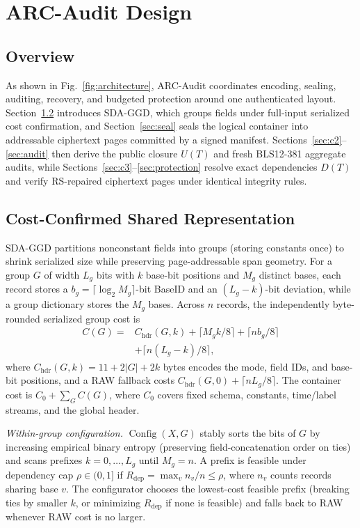 \documentclass[10pt,journal]{IEEEtran}
\begin{document}
\section{ARC-Audit Design}\label{sec:design}
\subsection{Overview}
As shown in Fig.~\ref{fig:architecture}, ARC-Audit coordinates encoding, sealing, auditing, recovery, and budgeted protection around one authenticated layout. Section~\ref{sec:c1} introduces SDA-GGD, which groups fields under full-input serialized cost confirmation, and Section~\ref{sec:seal} seals the logical container into addressable ciphertext pages committed by a signed manifest. Sections~\ref{sec:c2}--\ref{sec:audit} then derive the public closure $U(T)$ and fresh BLS12-381 aggregate audits, while Sections~\ref{sec:c3}--\ref{sec:protection} resolve exact dependencies $D(T)$ and verify RS-repaired ciphertext pages under identical integrity rules.

\subsection{Cost-Confirmed Shared Representation}\label{sec:c1}
SDA-GGD partitions nonconstant fields into groups (storing constants once) to shrink serialized size while preserving page-addressable span geometry. For a group $G$ of width $L_g$ bits with $k$ base-bit positions and $M_g$ distinct bases, each record stores a $b_g=\lceil\log_2 M_g\rceil$-bit BaseID and an $(L_g-k)$-bit deviation, while a group dictionary stores the $M_g$ bases. Across $n$ records, the independently byte-rounded serialized group cost is
\begin{equation}\label{eq:cost}
\begin{split}
C(G)={}&C_{\mathrm{hdr}}(G,k)+\lceil M_gk/8\rceil+\lceil nb_g/8\rceil\\
 &+\lceil n(L_g-k)/8\rceil,
\end{split}
\end{equation}
where $C_{\mathrm{hdr}}(G,k)=11+2|G|+2k$ bytes encodes the mode, field IDs, and base-bit positions, and a RAW fallback costs $C_{\mathrm{hdr}}(G,0)+\lceil nL_g/8\rceil$. The container cost is $C_0+\sum_G C(G)$, where $C_0$ covers fixed schema, constants, time/label streams, and the global header.

\emph{Within-group configuration.}
$\operatorname{Config}(X,G)$ stably sorts the bits of $G$ by increasing empirical binary entropy (preserving field-concatenation order on ties) and scans prefixes $k=0,\ldots,L_g$ until $M_g=n$. A prefix is feasible under dependency cap $\rho\in(0,1]$ if $R_{\mathrm{dep}}=\max_v n_v/n\leq\rho$, where $n_v$ counts records sharing base $v$. The configurator chooses the lowest-cost feasible prefix (breaking ties by smaller $k$, or minimizing $R_{\mathrm{dep}}$ if none is feasible) and falls back to RAW whenever RAW cost is no larger.
\end{document}
